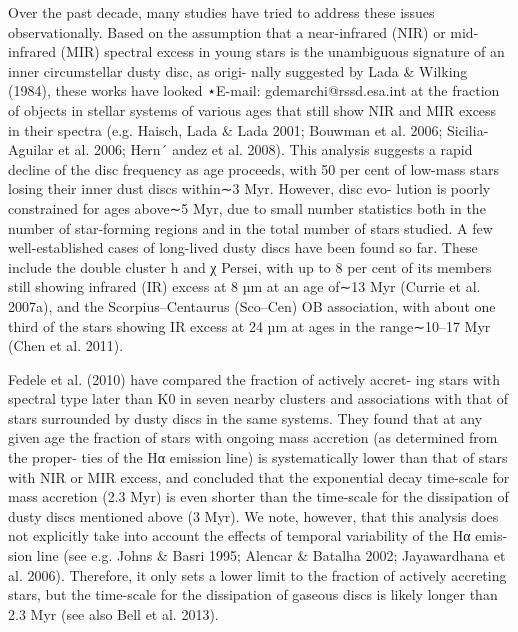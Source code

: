 \documentclass[../main.tex]{subfiles}
\begin{document}
{Over the past decade, many studies have tried to address these
issues observationally. Based on the assumption that a near-infrared
(NIR) or mid-infrared (MIR) spectral excess in young stars is the
unambiguous signature of an inner circumstellar dusty disc, as origi-
nally suggested by Lada & Wilking (1984), these works have looked
⋆E-mail: gdemarchi@rssd.esa.int
at the fraction of objects in stellar systems of various ages that
still show NIR and MIR excess in their spectra (e.g. Haisch, Lada
& Lada 2001; Bouwman et al. 2006; Sicilia-Aguilar et al. 2006;
Hern´ andez et al. 2008). This analysis suggests a rapid decline of the
disc frequency as age proceeds, with 50 per cent of low-mass stars
losing their inner dust discs within∼3 Myr. However, disc evo-
lution is poorly constrained for ages above∼5 Myr, due to small
number statistics both in the number of star-forming regions and
in the total number of stars studied. A few well-established cases
of long-lived dusty discs have been found so far. These include the
double cluster h and χ Persei, with up to 8 per cent of its members
still showing infrared (IR) excess at 8 µm at an age of∼13 Myr
(Currie et al. 2007a), and the Scorpius–Centaurus (Sco–Cen) OB
association, with about one third of the stars showing IR excess at
24 µm at ages in the range∼10–17 Myr (Chen et al. 2011).

Fedele et al. (2010) have compared the fraction of actively accret-
ing stars with spectral type later than K0 in seven nearby clusters
and associations with that of stars surrounded by dusty discs in
the same systems. They found that at any given age the fraction of
stars with ongoing mass accretion (as determined from the proper-
ties of the Hα emission line) is systematically lower than that of
stars with NIR or MIR excess, and concluded that the exponential
decay time-scale for mass accretion (2.3 Myr) is even shorter than
the time-scale for the dissipation of dusty discs mentioned above
(3 Myr). We note, however, that this analysis does not explicitly
take into account the effects of temporal variability of the Hα emis-
sion line (see e.g. Johns & Basri 1995; Alencar & Batalha 2002;
Jayawardhana et al. 2006). Therefore, it only sets a lower limit to
the fraction of actively accreting stars, but the time-scale for the
dissipation of gaseous discs is likely longer than 2.3 Myr (see also
Bell et al. 2013).

}
\end{document}
